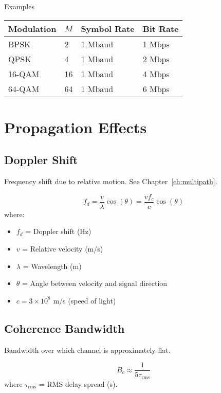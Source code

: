 \begin{calloutbox}{Examples}
\begin{tabular}{@{}llll@{}}
\toprule
Modulation & $M$ & Symbol Rate & Bit Rate \\
\midrule
BPSK & 2 & 1 Mbaud & 1 Mbps \\
QPSK & 4 & 1 Mbaud & 2 Mbps \\
16-QAM & 16 & 1 Mbaud & 4 Mbps \\
64-QAM & 64 & 1 Mbaud & 6 Mbps \\
\bottomrule
\end{tabular}
\end{calloutbox}

\section{Propagation Effects}
\label{sec:propagation-effects}

\subsection{Doppler Shift}
\label{sec:doppler-shift}

Frequency shift due to relative motion. See Chapter~\ref{ch:multipath}.

\begin{equation}
f_d = \frac{v}{\lambda} \cos(\theta) = \frac{vf_c}{c} \cos(\theta)
\label{eq:doppler}
\end{equation}
where:
\begin{itemize}
\item $f_d$ = Doppler shift (Hz)
\item $v$ = Relative velocity (m/s)
\item $\lambda$ = Wavelength (m)
\item $\theta$ = Angle between velocity and signal direction
\item $c = 3 \times 10^8$ m/s (speed of light)
\end{itemize}

\subsection{Coherence Bandwidth}
\label{sec:coherence-bandwidth}

Bandwidth over which channel is approximately flat.

\begin{equation}
B_c \approx \frac{1}{5\tau_{\text{rms}}}
\label{eq:coherence-bandwidth}
\end{equation}
where $\tau_{\text{rms}}$ = RMS delay spread (s).

